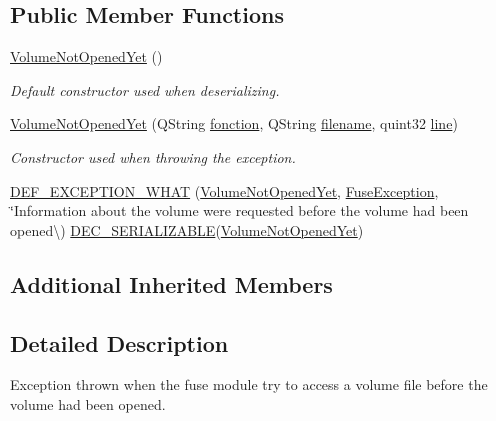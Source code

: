 \subsection*{Public Member Functions}
\begin{DoxyCompactItemize}
\item 
\hyperlink{class_gost_crypt_1_1_fuse_driver_1_1_volume_not_opened_yet_ad2ca89f7fcf03ddde3050c317f6e258a}{Volume\+Not\+Opened\+Yet} ()
\begin{DoxyCompactList}\small\item\em Default constructor used when deserializing. \end{DoxyCompactList}\item 
\hyperlink{class_gost_crypt_1_1_fuse_driver_1_1_volume_not_opened_yet_a5c8b5701f744f3ad7f595e8df67351c3}{Volume\+Not\+Opened\+Yet} (Q\+String \hyperlink{class_gost_crypt_1_1_gost_crypt_exception_a29b8c93d5efbb1ff369107385725a939}{fonction}, Q\+String \hyperlink{class_gost_crypt_1_1_gost_crypt_exception_a749a12375f4ba9d502623b99d8252f38}{filename}, quint32 \hyperlink{class_gost_crypt_1_1_gost_crypt_exception_abf506d911f12a4e969eea500f90bd32c}{line})
\begin{DoxyCompactList}\small\item\em Constructor used when throwing the exception. \end{DoxyCompactList}\item 
\hyperlink{class_gost_crypt_1_1_fuse_driver_1_1_volume_not_opened_yet_a2ca0de6d5ea69d3035068a58e8c05378}{D\+E\+F\+\_\+\+E\+X\+C\+E\+P\+T\+I\+O\+N\+\_\+\+W\+H\+AT} (\hyperlink{class_gost_crypt_1_1_fuse_driver_1_1_volume_not_opened_yet}{Volume\+Not\+Opened\+Yet}, \hyperlink{class_gost_crypt_1_1_fuse_driver_1_1_fuse_exception}{Fuse\+Exception}, \char`\"{}Information about the volume were requested before the volume had been opened\textbackslash{}) \hyperlink{class_gost_crypt_1_1_fuse_driver_1_1_fuse_exception_a9e484bd1c55627664542200c8ff2d291}{D\+E\+C\+\_\+\+S\+E\+R\+I\+A\+L\+I\+Z\+A\+B\+LE}(\hyperlink{class_gost_crypt_1_1_fuse_driver_1_1_volume_not_opened_yet}{Volume\+Not\+Opened\+Yet})
\end{DoxyCompactItemize}
\subsection*{Additional Inherited Members}


\subsection{Detailed Description}
Exception thrown when the fuse module try to access a volume file before the volume had been opened. 

